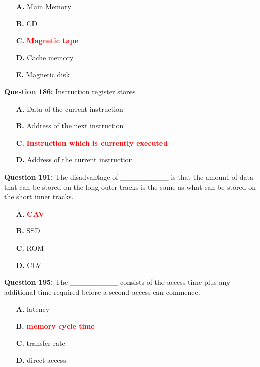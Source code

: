 \documentclass[12pt,a4paper]{article}
\begin{document}
\begin{itemize}
    \item[\textbf{A.}] Main Memory
    \item[\textbf{B.}] CD
    \item[\textbf{C.}] \textcolor{red}{\textbf{Magnetic tape}}
    \item[\textbf{D.}] Cache memory
    \item[\textbf{E.}] Magnetic disk
\end{itemize}

\vspace{0.5cm}

\textbf{Question 186:} Instruction register stores_________

\begin{itemize}
    \item[\textbf{A.}] Data of the current instruction
    \item[\textbf{B.}] Address of the next instruction
    \item[\textbf{C.}] \textcolor{red}{\textbf{Instruction which is currently executed}}
    \item[\textbf{D.}] Address of the current instruction
\end{itemize}

\vspace{0.5cm}

\textbf{Question 191:} The disadvantage of _________ is that the amount of data that can be stored on the long outer tracks is the same as what can be stored on the short inner tracks.

\begin{itemize}
    \item[\textbf{A.}] \textcolor{red}{\textbf{CAV}}
    \item[\textbf{B.}] SSD
    \item[\textbf{C.}] ROM
    \item[\textbf{D.}] CLV
\end{itemize}

\vspace{0.5cm}

\textbf{Question 195:} The _________ consists of the access time plus any additional time required before a second access can commence.

\begin{itemize}
    \item[\textbf{A.}] latency
    \item[\textbf{B.}] \textcolor{red}{\textbf{memory cycle time}}
    \item[\textbf{C.}] transfer rate
    \item[\textbf{D.}] direct access
\end{itemize}
\end{document}
